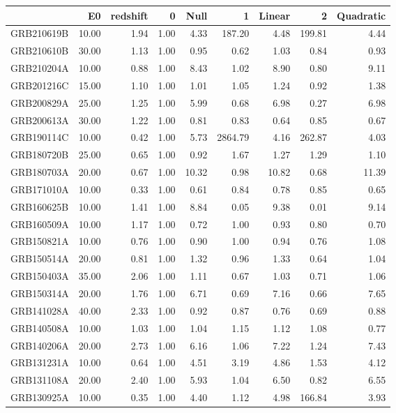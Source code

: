 \begin{tabular}{lrrrrrrrr}
\toprule
 & E0 & redshift & 0 & Null & 1 & Linear & 2 & Quadratic \\
\midrule
GRB210619B & 10.00 & 1.94 & 1.00 & 4.33 & 187.20 & 4.48 & 199.81 & 4.44 \\
GRB210610B & 30.00 & 1.13 & 1.00 & 0.95 & 0.62 & 1.03 & 0.84 & 0.93 \\
GRB210204A & 10.00 & 0.88 & 1.00 & 8.43 & 1.02 & 8.90 & 0.80 & 9.11 \\
GRB201216C & 15.00 & 1.10 & 1.00 & 1.01 & 1.05 & 1.24 & 0.92 & 1.38 \\
GRB200829A & 25.00 & 1.25 & 1.00 & 5.99 & 0.68 & 6.98 & 0.27 & 6.98 \\
GRB200613A & 30.00 & 1.22 & 1.00 & 0.81 & 0.83 & 0.64 & 0.85 & 0.67 \\
GRB190114C & 10.00 & 0.42 & 1.00 & 5.73 & 2864.79 & 4.16 & 262.87 & 4.03 \\
GRB180720B & 25.00 & 0.65 & 1.00 & 0.92 & 1.67 & 1.27 & 1.29 & 1.10 \\
GRB180703A & 20.00 & 0.67 & 1.00 & 10.32 & 0.98 & 10.82 & 0.68 & 11.39 \\
GRB171010A & 10.00 & 0.33 & 1.00 & 0.61 & 0.84 & 0.78 & 0.85 & 0.65 \\
GRB160625B & 10.00 & 1.41 & 1.00 & 8.84 & 0.05 & 9.38 & 0.01 & 9.14 \\
GRB160509A & 10.00 & 1.17 & 1.00 & 0.72 & 1.00 & 0.93 & 0.80 & 0.70 \\
GRB150821A & 10.00 & 0.76 & 1.00 & 0.90 & 1.00 & 0.94 & 0.76 & 1.08 \\
GRB150514A & 20.00 & 0.81 & 1.00 & 1.32 & 0.96 & 1.33 & 0.64 & 1.04 \\
GRB150403A & 35.00 & 2.06 & 1.00 & 1.11 & 0.67 & 1.03 & 0.71 & 1.06 \\
GRB150314A & 20.00 & 1.76 & 1.00 & 6.71 & 0.69 & 7.16 & 0.66 & 7.65 \\
GRB141028A & 40.00 & 2.33 & 1.00 & 0.92 & 0.87 & 0.76 & 0.69 & 0.88 \\
GRB140508A & 10.00 & 1.03 & 1.00 & 1.04 & 1.15 & 1.12 & 1.08 & 0.77 \\
GRB140206A & 20.00 & 2.73 & 1.00 & 6.16 & 1.06 & 7.22 & 1.24 & 7.43 \\
GRB131231A & 10.00 & 0.64 & 1.00 & 4.51 & 3.19 & 4.86 & 1.53 & 4.12 \\
GRB131108A & 20.00 & 2.40 & 1.00 & 5.93 & 1.04 & 6.50 & 0.82 & 6.55 \\
GRB130925A & 10.00 & 0.35 & 1.00 & 4.40 & 1.12 & 4.98 & 166.84 & 3.93 \\

\end{tabular}
